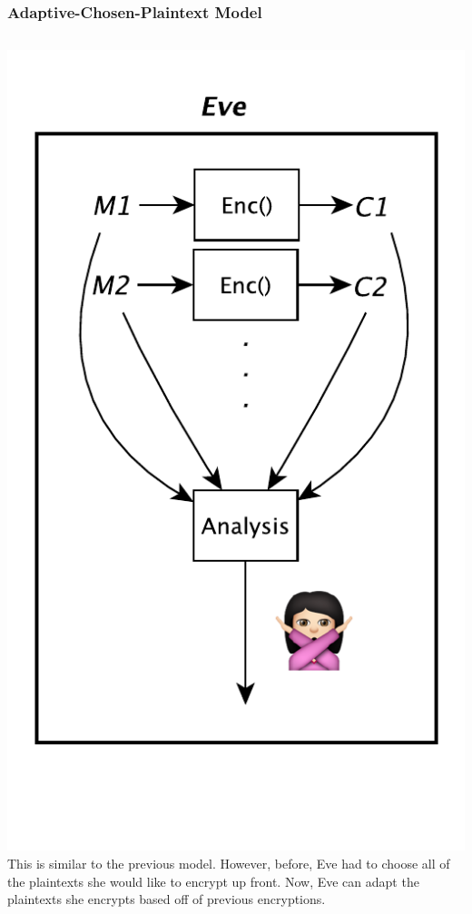 \documentclass{beamer}
\newcommand{\<}{\langle}
\renewcommand{\>}{\rangle}
\begin{document}
\begin{frame}
\frametitle{Adaptive-Chosen-Plaintext Model}

\begin{columns}
\centering
\includegraphics[scale=.5]{IMG/attack3.pdf}
This is similar to the previous model. However, before, Eve had to choose all of the plaintexts she would like to encrypt up front. Now, Eve can adapt the plaintexts she encrypts based off of previous encryptions. \newline
\end{columns} 
\end{frame}
\end{document}
